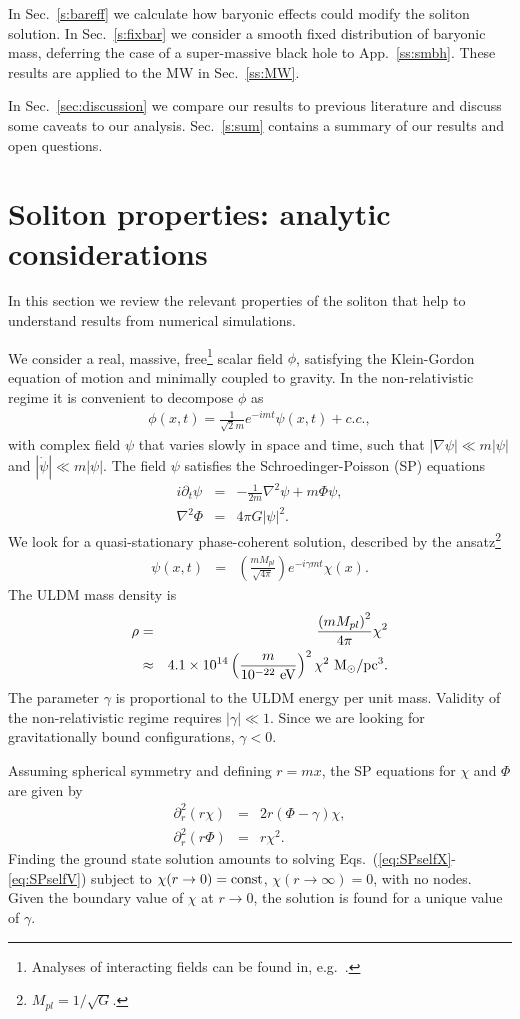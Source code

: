\documentclass[aps,prd,floats,superscriptaddress,showpacs,nofootinbib,twocolumn,preprintnumbers]{revtex4-1}%
\def\be{\begin{eqnarray}}
\def\ee{\end{eqnarray}}
\def\no{\nonumber}
\begin{document}
In
Sec.~\ref{s:bareff} we calculate how baryonic effects could modify the
soliton solution. In Sec.~\ref{s:fixbar} we consider a smooth fixed
distribution of baryonic mass, deferring the case of a super-massive
black hole to App.~\ref{ss:smbh}. 
These results are applied to the MW in 
Sec.~\ref{ss:MW}.

In Sec.~\ref{sec:discussion} we compare our results to previous literature and
discuss some caveats to our analysis.
Sec.~\ref{s:sum} contains a summary of our results and open questions.



\section{Soliton properties: analytic considerations}\label{ssec:solprop}
In this section we review the relevant properties of the soliton that
help to understand results from numerical simulations.  

We consider a real, massive, free\footnote{Analyses of interacting
  fields can be found in,
  e.g.~\cite{Chavanis:2011zi,Chavanis:2011zm,RindlerDaller:2012vj,Desjacques:2017fmf}.}
scalar field $\phi$, satisfying the Klein-Gordon equation of motion
and minimally coupled to gravity.   
In the non-relativistic regime it is convenient to decompose $\phi$ as
%
\be\label{eq:schroedfield}\phi(x,t)=\frac{1}{\sqrt{2}m}e^{-imt}\psi(x,t)+c.c.,\ee
%
with complex field $\psi$ that varies slowly in space and time, such
that $|\nabla\psi|\ll m|\psi|$ and $|\dot\psi|\ll m|\psi|$. The field
$\psi$
satisfies the Schroedinger-Poisson (SP) equations~\cite{Ruffini:1969qy}
%
\be\label{eq:SP1} i\partial_t\psi&=&-\frac{1}{2m}\nabla^2\psi+m\Phi\psi,\\
\label{eq:SP2}\nabla^2\Phi&=&4\pi G|\psi|^2.\ee
% 
We look for a quasi-stationary phase-coherent solution, described by the ansatz\footnote{$M_{pl}=1/\sqrt{G}$.}
%
\be\label{eq:schroedfield2}\psi(x,t)&=&\left(\frac{mM_{pl}}{\sqrt{4\pi}}\right)e^{-i\gamma mt}\chi(x).\ee
%
The ULDM mass density is
%
\be\rho&=&\frac{\left(mM_{pl}\right)^2}{4\pi}\chi^2\\
&\approx&4.1\times10^{14}\left(\frac{m}{10^{-22}~\rm eV}\right)^2\chi^2~{\rm M_\odot/pc^3}.\no\ee
%
The parameter $\gamma$ is proportional to the ULDM energy per unit
mass.
Validity of the non-relativistic regime requires $|\gamma|\ll 1$. 
Since we are looking for gravitationally bound configurations,
$\gamma<0$.  

Assuming spherical symmetry and defining $r=mx$, the SP equations for $\chi$ and $\Phi$ are given by
%
\be\partial_r^2\left(r\chi\right)&=&2r\left(\Phi-\gamma\right)\chi,\label{eq:SPselfX}\\
\partial_r^2\left(r\Phi\right)&=&r\chi^2\label{eq:SPselfV}.\ee
%
Finding the ground state solution amounts to solving Eqs.~(\ref{eq:SPselfX}-\ref{eq:SPselfV}) subject to $\chi(r\to0)={\rm const}$, $\chi(r\to\infty)=0$, with no nodes. Given the boundary value of $\chi$ at $r\to0$, the solution is found for a unique value of $\gamma$. 
\end{document}
